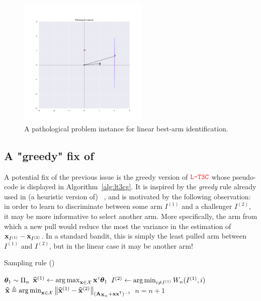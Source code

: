 \begin{figure}[ht]
    \centering
    \includegraphics[width=0.55\textwidth]{Chapter4/img/instance.pdf}
    \caption{A pathological problem instance for linear best-arm identification.}
    \label{fig:instance}
\end{figure}

\subsection{A "greedy" fix of \LTCC{}}\label{sec:lgc.bayesian.fix}

A potential fix of the previous issue is the greedy version of $\textcolor{red}{\texttt{L-T3C}}$ whose pseudo-code is displayed in Algorithm~\ref{alg:lt3cg}. It is inspired by the \emph{greedy} rule already used in (a heuristic version of) \LGapE~\citep{xu2018linear}, and is motivated by the following observation: in order to learn to discriminate between some arm $I^{(1)}$ and a challenger $I^{(2)}$, it may be more informative to select another arm. More specifically, the arm from which a new pull would reduce the most the variance in the estimation of ${\bf x}_{I^{(1)}} - {\bf x}_{I^{(2)}}$. In a standard bandit, this is simply the least pulled arm between $I^{(1)}$ and $I^{(2)}$, but in the linear case it may be another arm!

\begin{algorithm}[ht]
\centering
\caption{Sampling rule (\LTCCG)}
\label{alg:lt3cg}
\begin{algorithmic}[1]
        \State {} ${\boldsymbol \theta}_1 \sim \Pi_n$
        \State $\widehat{{\bf x}}^{(1)} \leftarrow \operatorname*{arg\,max}_{{\bf x}\in\mathcal{X}} {\bf x}^\mathsf{\scriptscriptstyle T}{\boldsymbol \theta}_1$ 
	        \State $I^{(2)} \leftarrow \operatorname*{arg\,min}_{i\neq I^{(1)}}W_n(I^{(1)},i)$ 
		    \State {} $\widehat{{\bf x}} \triangleq \operatorname*{arg\,min}_{{\bf x}\in\mathcal{X}} \left\lVert\widehat{{\bf x}}^{(1)} - \widehat{{\bf x}}^{(2)}\right\rVert_{({\bf A}_{{\bf X}_n}+{\bf x}{\bf x}^\mathsf{\scriptscriptstyle T})^{-1}}$
	    \State {}
	    \State $n = n+1$
   \EndFor
\end{algorithmic}
\end{algorithm}

